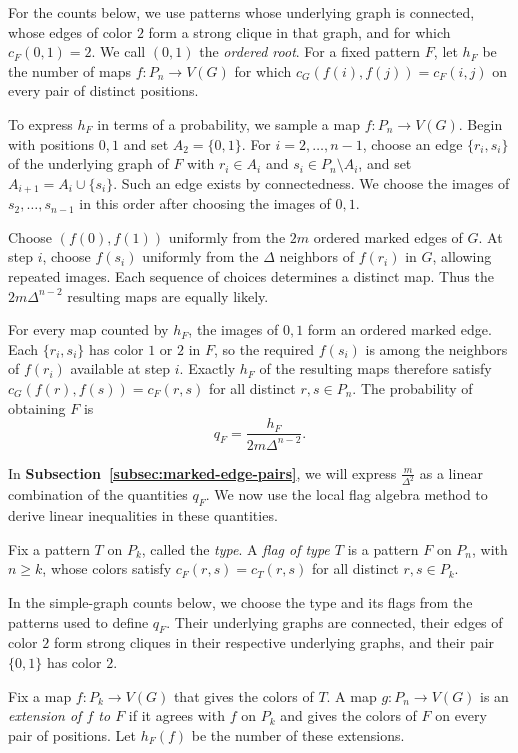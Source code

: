 \documentclass[preprint,11pt,numbers]{elsarticle-arxiv}
\numberwithin{equation}{section}
\theoremstyle{definition}
\begin{document}
For the counts below, we use patterns whose underlying graph is
connected, whose edges of color $2$ form a strong clique in that
graph, and for which $c_F(0,1)=2$. We call $(0,1)$ the
\emph{ordered root}. For a fixed pattern $F$, let $h_F$ be the number
of maps $f\colon P_n\to V(G)$ for which
$c_G(f(i),f(j))=c_F(i,j)$ on every pair of distinct positions.

To express $h_F$ in terms of a probability, we sample a map
$f\colon P_n\to V(G)$. Begin with positions $0,1$ and set
$A_2=\{0,1\}$. For $i=2,\ldots,n-1$, choose an edge
$\{r_i,s_i\}$ of the underlying graph of $F$ with $r_i\in A_i$
and $s_i\in P_n\setminus A_i$, and set
$A_{i+1}=A_i\cup\{s_i\}$. Such an edge exists by connectedness.
We choose the images of $s_2,\ldots,s_{n-1}$ in this order after
choosing the images of $0,1$.

Choose $(f(0),f(1))$ uniformly from the $2m$ ordered marked edges of
$G$. At step $i$, choose $f(s_i)$ uniformly from the $\Delta$
neighbors of $f(r_i)$ in $G$, allowing repeated images. Each
sequence of choices determines a distinct map. Thus the
$2m\Delta^{n-2}$ resulting maps are equally likely.

For every map counted by $h_F$, the images of $0,1$ form an ordered
marked edge. Each $\{r_i,s_i\}$ has color $1$ or $2$ in $F$, so the
required $f(s_i)$ is among the neighbors of $f(r_i)$ available at
step $i$. Exactly $h_F$ of the resulting maps therefore satisfy
$c_G(f(r),f(s))=c_F(r,s)$ for all distinct $r,s\in P_n$. The
probability of obtaining $F$ is
\[
 q_F=\frac{h_F}{2m\Delta^{n-2}}.
\]

In \textbf{Subsection~\ref{subsec:marked-edge-pairs}}, we will express
$\frac{m}{\Delta^2}$ as a linear combination of the quantities $q_F$.
We now use the local flag algebra method to derive linear inequalities
in these quantities.

Fix a pattern $T$ on $P_k$, called the \emph{type}. A \emph{flag
of type $T$} is a pattern $F$ on $P_n$, with $n\geq k$, whose
colors satisfy
$c_F(r,s)=c_T(r,s)$ for all distinct $r,s\in P_k$.

In the simple-graph counts below, we choose the type and its flags
from the patterns used to define $q_F$. Their underlying graphs
are connected, their edges of color $2$ form strong cliques in
their respective underlying graphs, and their pair $\{0,1\}$ has
color $2$.

Fix a map $f\colon P_k\to V(G)$ that gives the colors of $T$.
A map $g\colon P_n\to V(G)$ is an \emph{extension of $f$ to $F$}
if it agrees with $f$ on $P_k$ and gives the colors of $F$ on every
pair of positions. Let $h_F(f)$ be the number of these extensions.
\end{document}
